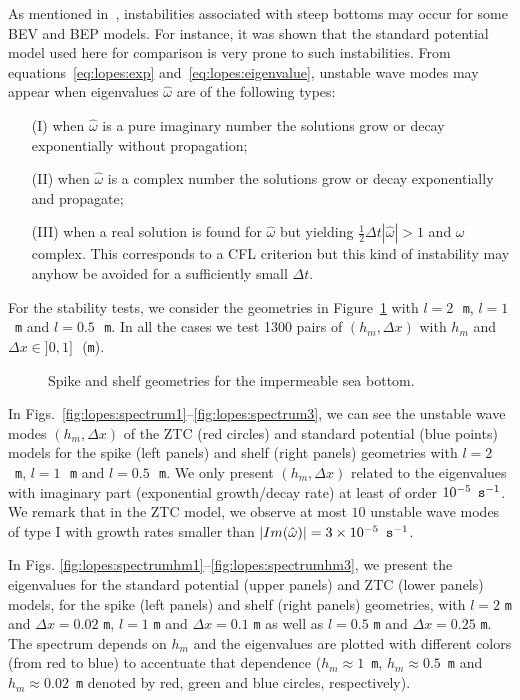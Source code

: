As mentioned in~\citet{LovholtPedersen2009}, instabilities
 associated with steep bottoms may occur for some BEV and
 BEP models.  For instance, it was shown that the standard
 potential model used here for comparison is very prone to
 such instabilities.
From equations~\eqref{eq:lopes:exp}
and~\eqref{eq:lopes:eigenvalue},  unstable wave modes  may appear when
eigenvalues $\hat\omega$ are of the following types:
\begin{itemize}
\item[(I)] when $\hat\omega$ is a pure imaginary number the
solutions grow or decay exponentially without propagation;
\item[(II)] when $\hat\omega$ is a complex number the solutions grow
or decay exponentially and propagate;
\item[(III)] when a real solution is found for
$\hat\omega$ but  yielding $\frac{1}{2}\Delta t
|\hat\omega|>1$ and $\omega$ complex.
This corresponds to a CFL criterion but this kind
of instability may anyhow be avoided for a sufficiently
small $\Delta t$.
\end{itemize}

For the  stability tests, we consider the geometries
in Figure~\ref{fig:lopes:spikeshelf}
with  $l=2$\,~{\tt m}, $l=1$\,~{\tt m} and $l=0.5$\,~{\tt m}.
In all the cases we test  1300 pairs of
$(h_m,\Delta x)$ with $ h_m$ and $\Delta x\in ]0,1]$\,~({\tt m}).
\begin{figure}
{\small
\begin{center}
\end{center}
}
\caption{Spike and shelf geometries for the impermeable sea bottom.}
\label{fig:lopes:spikeshelf}
\end{figure}

In
Figs.~\ref{fig:lopes:spectrum1}--\ref{fig:lopes:spectrum3},
we can see the unstable wave modes $(h_m,\Delta x)$ of the ZTC
(red circles) and standard potential (blue points) models
for the spike (left panels) and shelf (right panels)
geometries with $l=2$\,~{\tt m}, $l=1$\,~{\tt m} and
$l=0.5$\,~{\tt m}.  We only present $(h_m,\Delta x)$ related
to the eigenvalues with imaginary part (exponential
growth/decay rate) at least of order $10^{-5}\,~{\tt
s}^{-1}$.  We remark that in the ZTC model, we
observe at most $10$ unstable wave modes of type I
with growth rates smaller than $|Im(\hat\omega)|=3\times
10^{-5}\,~{\tt s}^{-1}$.



In Figs. \ref{fig:lopes:spectrumhm1}--\ref{fig:lopes:spectrumhm3},
we present the eigenvalues for the standard potential
 (upper panels) and ZTC (lower panels)
 models, for the spike (left panels) and
 shelf (right panels) geometries, with  $l=2$ {\tt m} and
 $\Delta x=0.02$ {\tt m}, $l=1$ {\tt m} and
 $\Delta x=0.1$ {\tt m} as well as
$l=0.5$ {\tt m} and
 $\Delta x=0.25$ {\tt m}.
The  spectrum   depends  on $h_m$ and the eigenvalues are
plotted with different colors (from red to blue) to accentuate that
dependence ($h_m\approx 1$~{\tt m},
$h_m\approx 0.5$~{\tt m}
 and $h_m\approx 0.02$~{\tt m} denoted by red, green and
 blue circles, respectively).

